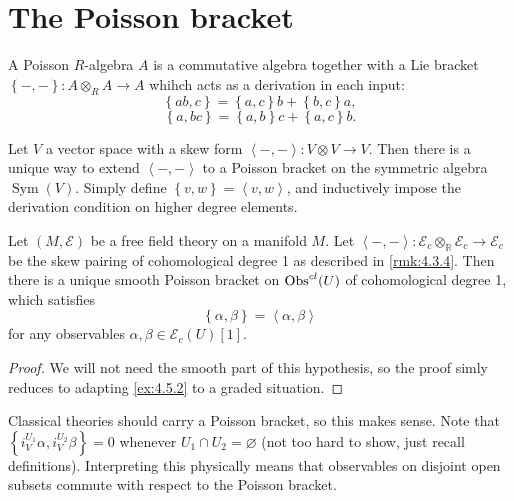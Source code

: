 
\section{The Poisson bracket}


\begin{definition}\label{dfn:4.5.1}
	A Poisson $R$-algebra $A$ is a commutative algebra together with a Lie bracket $\left\{ -,- \right\} : A\otimes_R A \to A$ whihch acts as a derivation in each input:
	\[
		\left\{ ab,c \right\} =\left\{ a,c \right\} b + \left\{ b,c \right\} a,
	\]
	\[
		\left\{ a,bc \right\} =\left\{ a,b \right\} c+ \left\{ a,c \right\} b
	.\]
\end{definition}

\begin{example}\label{ex:4.5.2}
	Let $V$ a vector space with a skew form $\left\langle -,- \right\rangle : V\otimes V \to V$. Then there is a unique way to extend $\left\langle -,- \right\rangle $ to a Poisson bracket on the symmetric algebra $\operatorname{Sym} (V)$. Simply define $\left\{ v,w \right\} =\left\langle v,w \right\rangle $, and inductively impose the derivation condition on higher degree elements.
\end{example}

\begin{lemma}\label{lma:4.5.3}
	Let $(M,\mathcal{E} )$ be a free field theory on a manifold $M$. Let $\left\langle -,- \right\rangle : \mathcal{E} _c\otimes_\mathbb{R} \mathcal{E} _c \to \mathcal{E} _c$ be the skew pairing of cohomological degree 1 as described in \cref{rmk:4.3.4}. Then there is a unique smooth Poisson bracket on $\operatorname{Obs}^{cl} (U)$ of cohomological degree 1, which satisfies
	\[
		\left\{ \alpha ,\beta  \right\} =\left\langle \alpha ,\beta  \right\rangle 
	\]
	for any observables $\alpha ,\beta \in \mathcal{E} _c(U)[1]$.
\end{lemma}
\begin{proof}
	We will not need the smooth part of this hypothesis, so the proof simly reduces to adapting \cref{ex:4.5.2} to a graded situation.
\end{proof}

Classical theories should carry a Poisson bracket, so this makes sense. Note that $\left\{ i_V^{U_1} \alpha ,i_V^{U_2} \beta  \right\} =0$ whenever $U_1 \cap U_2 =\varnothing $ (not too hard to show, just recall definitions). Interpreting this physically means that observables on disjoint open subsets commute with respect to the Poisson bracket.







